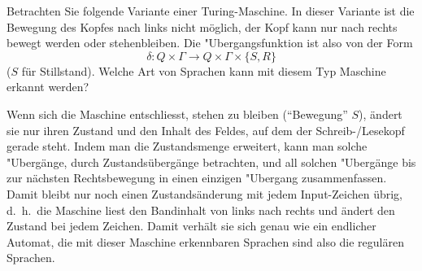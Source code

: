 Betrachten Sie folgende Variante einer Turing-Maschine. In dieser
Variante ist die Bewegung des Kopfes nach links nicht möglich,
der Kopf kann nur nach rechts bewegt werden oder stehenbleiben. Die
"Ubergangsfunktion ist also von der Form
$$\delta:Q\times \Gamma\to Q\times\Gamma\times \{S,R\}$$
($S$ für Stillstand). Welche Art von Sprachen kann mit diesem
Typ Maschine erkannt werden?


\begin{loesung}
Wenn sich die Maschine entschliesst, stehen zu bleiben (``Bewegung'' $S$),
ändert sie
nur ihren Zustand und den Inhalt des Feldes, auf dem der Schreib-/Lesekopf
gerade steht. Indem man die Zustandsmenge erweitert, kann man solche
"Ubergänge, durch Zustandsübergänge betrachten, und all solchen "Ubergänge
bis zur nächsten Rechtsbewegung in einen einzigen "Ubergang zusammenfassen.
Damit bleibt nur noch einen Zustandsänderung mit jedem Input-Zeichen
übrig, d.~h.~die Maschine liest den Bandinhalt von links nach rechts und
ändert den Zustand bei jedem Zeichen. Damit verhält sie sich genau
wie ein endlicher Automat, die mit dieser Maschine erkennbaren Sprachen
sind also die regulären Sprachen.
\end{loesung}
